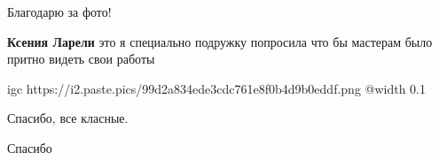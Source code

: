  
 
 
 
 

\qqSecCmt


Благодарю за фото!

\begin{itemize} %
\textbf{Ксения Ларели} это я специально подружку попросила что бы мастерам было притно видеть свои работы 🙂
\end{itemize} %


\ifcmt
  igc https://i2.paste.pics/99d2a834ede3cdc761e8f0b4d9b0eddf.png
  @width 0.1
\fi


Спасибо, все класные.


Спасибо 💙

